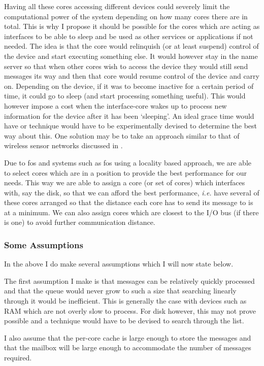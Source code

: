 \documentclass[journal]{IEEEtran}
\begin{document}
Having all these cores accessing different devices could severely limit the computational power of the system depending on how many cores there are in total. This is why I propose it should be possible for the cores which are acting as interfaces to be able to sleep and be used as other services or applications if not needed. The idea is that the core would relinquish (or at least suspend) control of the device and start executing something else. It would however stay in the name server so that when other cores wish to access the device they would still send messages its way and then that core would resume control of the device and carry on. Depending on the device, if it was to become inactive for a certain period of time, it could go to sleep (and start processing something useful). This would however impose a cost when the interface-core wakes up to process new information for the device after it has been `sleeping'. An ideal grace time would have or technique would have to be experimentally devised to determine the best way about this. One solution may be to take an approach similar to that of wireless sensor networks discussed in \cite{wsn}.

Due to fos and systems such as fos using a locality based approach, we are able to select cores which are in a position to provide the best performance for our needs. This way we are able to assign a core (or set of cores) which interfaces with, say the disk, so that we can afford the best performance, \emph{i.e.} have several of these cores arranged so that the distance each core has to send its message to is at a minimum. We can also assign cores which are closest to the I/O bus (if there is one) to avoid further communication distance. 

\subsubsection{Some Assumptions}
In the above I do make several assumptions which I will now state below.

The first assumption I make is that messages can be relatively quickly processed and that the queue would never grow to such a size that searching linearly through it would be inefficient. This is generally the case with devices such as RAM which are not overly slow to process. For disk however, this may not prove possible and a technique would have to be devised to search through the list.

I also assume that the per-core cache is large enough to store the messages and that the mailbox will be large enough to accommodate the number of messages required.
\end{document}

